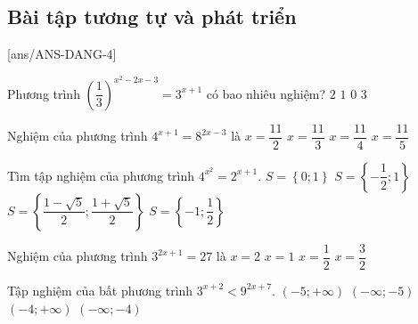 \subsection{Bài tập tương tự và phát triển}
[ans/ANS-DANG-4]
\begin{ex}%
	Phương trình ${\left( \dfrac{1}{3} \right)}^{x^2-2x-3}=3^{x+1}$ có bao nhiêu nghiệm?
	\choice
	{\True  $2$}
	{ $1$}
	{ $0$}
	{ $3$}
\end{ex}

\begin{ex}%
	Nghiệm của phương trình $4^{x+1}=8^{2x-3}$ là
	\choice
	{ $x=\dfrac{11}{2}$}
	{ $x=\dfrac{11}{3}$}
	{\True  $x=\dfrac{11}{4}$}
	{ $x=\dfrac{11}{5}$}
\end{ex}

\begin{ex}%
	Tìm tập nghiệm của phương trình $4^{x^2}=2^{x+1}$.
	\choice
	{ $S=\left\{ 0;1 \right\}$}
	{\True  $S=\left\{ -\dfrac{1}{2};1 \right\}$}
	{ $S=\left\{ \dfrac{1-\sqrt{5}}{2};\dfrac{1+\sqrt{5}}{2} \right\}$}
	{ $S=\left\{ -1;\dfrac{1}{2} \right\}$}
\end{ex}

\begin{ex}%
	Nghiệm của phương trình $3^{2x+1}=27$ là
	\choice
	{ $x=2$}
	{\True  $x=1$}
	{ $x=\dfrac{1}{2}$}
	{ $x=\dfrac{3}{2}$}
\end{ex}

\begin{ex}%
	Tập nghiệm của bất phương trình $3^{x+2}<9^{2x+7}$.
	\choice
	{ $\left( -5;+\infty  \right)$}
	{ $\left( -\infty ;-5 \right)$}
	{\True  $\left( -4;+\infty  \right)$}
	{ $\left( -\infty ;-4 \right)$}
\end{ex}

